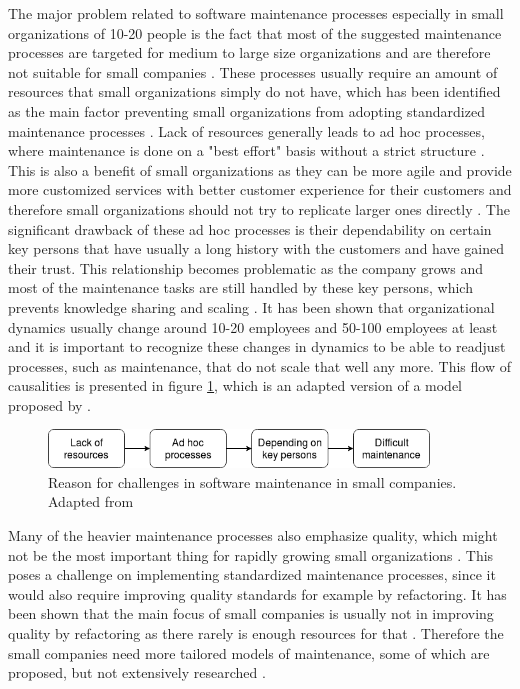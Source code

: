 The major problem related to software maintenance processes especially in small organizations of 10-20 people is the fact that most of the suggested maintenance processes are targeted for medium to
large size organizations and are therefore not suitable for small companies \citep{Basri2010}\citep{Hasan2011}\citep{Sanchez-Gordon2016}. These processes usually require an amount of resources
that small organizations simply do not have, which has been identified as the main factor preventing small organizations from adopting standardized maintenance processes \citep{Basri2010}.
Lack of resources generally leads to ad hoc processes, where maintenance is done on a "best effort" basis without a strict structure \citep{Hasan2011}. This is also a benefit of small organizations
as they can be more agile and provide more customized services with better customer experience for their customers and therefore small organizations should not try to replicate larger ones
directly \citep{Aranda2010}. The significant drawback of these ad hoc processes is their dependability on certain key persons that have usually a long history with the customers and have
gained their trust. This relationship becomes problematic as the company grows and most of the maintenance tasks are still handled by these key persons, which prevents knowledge sharing and scaling \citep{Hasan2011}.
It has been shown that organizational dynamics usually change around 10-20 employees and 50-100 employees at least and it is important to recognize these changes in dynamics to be able to
readjust processes, such as maintenance, that do not scale that well any more.
This flow of causalities is presented in figure \ref{fig:hasan-flow}, which is an adapted version of a model proposed by \citet[p.~5]{Hasan2011}.

\begin{figure}[ht]
  \begin{center}
    \includegraphics[width=0.9\textwidth]{images/Hasan2011-flow.png}
    \caption{Reason for challenges in software maintenance in small companies. Adapted from \citet[p.~5]{Hasan2011}}
    \label{fig:hasan-flow}
  \end{center}
\end{figure}

Many of the heavier maintenance processes also emphasize quality, which might not be the most important thing for rapidly growing small organizations \citep{Sanchez-Gordon2016}. This poses
a challenge on implementing standardized maintenance processes, since it would also require improving quality standards for example by refactoring. It has been shown that the main focus of
small companies is usually not in improving quality by refactoring as there rarely is enough resources for that \citep{Kajko-Mattsson2009}.
Therefore the small companies need more tailored
models of maintenance, some of which are proposed, but not extensively researched \citep{Hanssen2009}.

